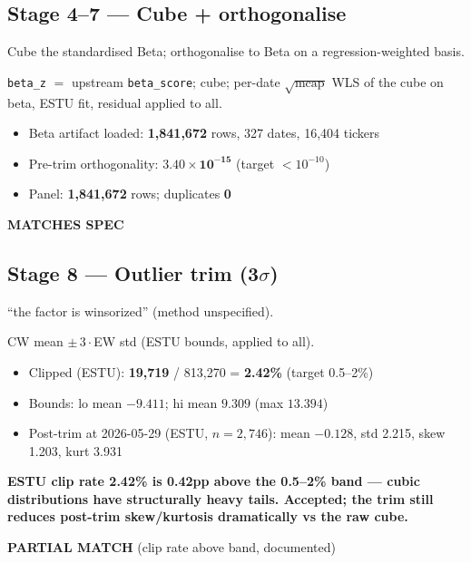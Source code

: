 \documentclass[11pt,a4paper]{article}
\newcommand{\PASS}[1]{\textcolor{pass}{\textbf{#1}}}
\newcommand{\WARN}[1]{\textcolor{warn}{\textbf{#1}}}
\begin{document}
\subsection{Stage 4--7 --- Cube + orthogonalise}

\begin{description}[style=nextline]
  \item[PDF SPEC] Cube the standardised Beta; orthogonalise to Beta on a regression-weighted basis.
  \item[Implementation] \texttt{beta\_z} $=$ upstream \texttt{beta\_score}; cube; per-date $\sqrt{\text{mcap}}$ WLS of the cube on beta, ESTU fit, residual applied to all.
  \item[Observed]\phantom{x}
    \begin{itemize}[nosep, topsep=-\parskip]
      \item Beta artifact loaded: \textbf{1{,}841{,}672} rows, 327 dates, 16{,}404 tickers
      \item Pre-trim orthogonality: $\mathbf{3.40\times10^{-15}}$ (target $<10^{-10}$)
      \item Panel: \textbf{1{,}841{,}672} rows; duplicates \textbf{0}
    \end{itemize}
  \item[Status] \PASS{MATCHES SPEC}
\end{description}

\subsection{Stage 8 --- Outlier trim (3$\sigma$)}

\begin{description}[style=nextline]
  \item[PDF SPEC] ``the factor is winsorized'' (method unspecified).
  \item[Implementation] CW mean $\pm\,3\cdot$EW std (ESTU bounds, applied to all).
  \item[Observed]\phantom{x}
    \begin{itemize}[nosep, topsep=-\parskip]
      \item Clipped (ESTU): \textbf{19{,}719} / 813{,}270 = \textbf{2.42\%} (target 0.5--2\%)
      \item Bounds: lo mean $-9.411$; hi mean $9.309$ (max $13.394$)
      \item Post-trim at 2026-05-29 (ESTU, $n=2{,}746$): mean $-0.128$, std 2.215, skew 1.203, kurt 3.931
    \end{itemize}
  \item[Deviation] \WARN{ESTU clip rate 2.42\% is 0.42pp above the 0.5--2\% band --- cubic distributions have structurally heavy tails. Accepted; the trim still reduces post-trim skew/kurtosis dramatically vs the raw cube.}
  \item[Status] \WARN{PARTIAL MATCH} (clip rate above band, documented)
\end{description}
\end{document}
